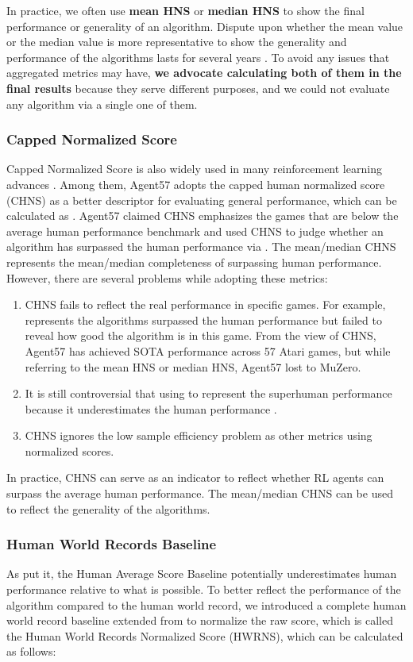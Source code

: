 \documentclass[nohyperref]{article}
\theoremstyle{plain}
\begin{document}
In practice, we often use \textbf{mean HNS} or \textbf{median HNS} to show the final performance or generality of an algorithm. Dispute upon whether the mean value or the median value is more representative to show the generality and performance of the algorithms lasts for several years \citep{dqn,rainbow,dreamerv2,muesli,ale,ale2}. To avoid any issues that aggregated metrics may have, \textbf{we advocate calculating both of them in the final results} because they serve different purposes, and we could not evaluate any algorithm via a single one of them. 


\subsubsection{Capped Normalized Score}
Capped Normalized Score is also widely used in many reinforcement learning advances \citep{atarihuman,agent57}. Among them, Agent57 \citep{agent57} adopts the capped human normalized score (CHNS) as a better descriptor for evaluating general performance, which can be calculated as . Agent57 claimed CHNS emphasizes the games that are below the average human performance benchmark and used CHNS to judge whether an algorithm has surpassed the human performance via .  The mean/median CHNS represents the mean/median completeness of surpassing human performance. However, there are several problems while adopting 
these metrics:
\begin{enumerate}
    \item CHNS fails to reflect the real performance in specific games. For example,  represents the algorithms surpassed the human performance but failed to reveal how good the algorithm is in this game. From the view of CHNS, Agent57 \citep{agent57} has achieved SOTA performance across 57 Atari games, but while referring to the mean HNS or median HNS, Agent57 lost to MuZero.
    \item It is still controversial that using  to represent the superhuman performance because it underestimates the human performance \citep{atarihuman}.
    \item CHNS ignores the low sample efficiency problem as other metrics using normalized scores.
\end{enumerate}

In practice, CHNS can serve as an indicator to reflect whether RL agents can surpass the average human performance. The mean/median CHNS can be used to reflect the generality of the algorithms.

\subsubsection{Human World Records Baseline}
As \citep{atarihuman} put it, the Human Average Score Baseline potentially underestimates human performance relative to what is possible. To better reflect the performance of the algorithm compared to the human world record, we introduced a complete human world record baseline extended from \citep{dreamerv2,atarihuman} to normalize the raw score, which is called the Human World Records Normalized Score (HWRNS), which can be calculated as follows:
\end{document}
